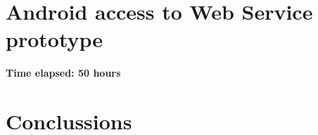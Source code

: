 \documentclass[11pt]{article}
\begin{document}
\section{Android access to Web Service prototype}

\textbf{Time elapsed: 50 hours}

\section{Conclussions}
\end{document}
